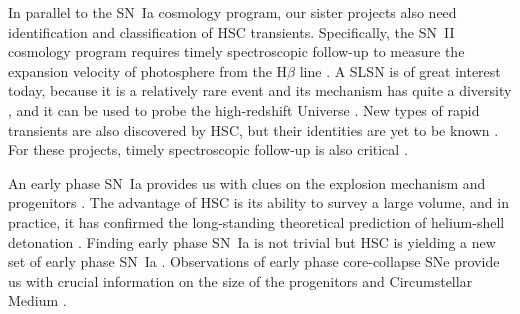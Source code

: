 \documentclass[useamsfonts]{pasj01}
\begin{document}
In parallel to the SN~Ia cosmology program, our sister projects also need identification and classification of HSC transients.   
Specifically, the SN~II cosmology program requires timely spectroscopic follow-up to measure the expansion velocity of photosphere from the H$\beta$ line \citep{dejaeger17a}.
A SLSN is of great interest today, because it is a relatively rare event \citep{quimby11a} and its mechanism has quite a diversity \citep{galyam12a,Moriya18SLSN}, and it can be used to probe the high-redshift Universe \citep{cooke12a}. 
New types of rapid transients are also discovered by HSC, but their identities are yet to be known \citep{Tampo2020}. 
For these projects, timely spectroscopic follow-up is also critical \citep{moriya19a,curtin19a}.

An early phase SN~Ia provides us with clues on the explosion mechanism \citep{maeda18a} and progenitors \citep{cao15a}.
The advantage of HSC is its ability to survey a large volume, and in practice, it has confirmed the long-standing theoretical prediction of helium-shell detonation \citep{Jiang2017}.
Finding early phase SN~Ia is not trivial but HSC is yielding a new set of early phase SN~Ia \citep{Jiang_2020}.
Observations of early phase core-collapse SNe provide us with crucial information on the size of the progenitors \citep{thompson03a,tominaga11a} and Circumstellar Medium \citep{forster18a}.

%
%
%
%
%
\end{document}
